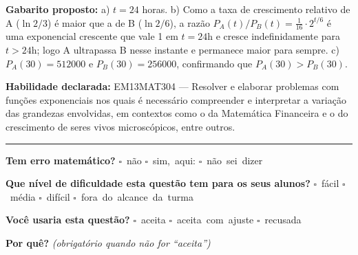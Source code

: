 \documentclass[11pt,a4paper]{article}
\begin{document}
\begin{samepage}
\textbf{Gabarito proposto:} a) $t = 24$ horas. b) Como a taxa de crescimento relativo de A ($\ln 2/3$) é maior que a de B ($\ln 2/6$), a razão $P_A(t)/P_B(t) = \frac{1}{16}\cdot 2^{t/6}$ é uma exponencial crescente que vale 1 em $t=24$h e cresce indefinidamente para $t>24$h; logo A ultrapassa B nesse instante e permanece maior para sempre. c) $P_A(30)=512000$ e $P_B(30)=256000$, confirmando que $P_A(30) > P_B(30)$.

\textbf{Habilidade declarada:} EM13MAT304 --- Resolver e elaborar problemas com funções exponenciais nos quais é necessário compreender e interpretar a variação das grandezas envolvidas, em contextos como o da Matemática Financeira e o do crescimento de seres vivos microscópicos, entre outros.
\end{samepage}

\noindent\rule{\linewidth}{0.4pt}
\textbf{Tem erro matemático?}\quad
\mbox{$\square$~não} \quad \mbox{$\square$~sim, aqui:} \underline{\hspace{5cm}}
\quad \mbox{$\square$~não sei dizer}

\textbf{Que nível de dificuldade esta questão tem para os seus alunos?}\quad
\mbox{$\square$~fácil} \quad \mbox{$\square$~média} \quad
\mbox{$\square$~difícil} \quad \mbox{$\square$~fora do alcance da turma}

\textbf{Você usaria esta questão?}\quad
\mbox{$\square$~aceita} \quad \mbox{$\square$~aceita com ajuste} \quad
\mbox{$\square$~recusada}

\textbf{Por quê?} \emph{(obrigatório quando não for ``aceita'')}

\underline{\hspace{\linewidth}}

\underline{\hspace{\linewidth}}
\vspace{0.6em}
\end{document}
